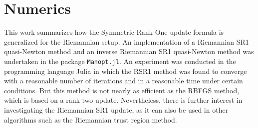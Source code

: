 \chapter{Numerics}

This work summarizes how the Symmetric Rank-One update formula is generalized for the Riemannian setup. An implementation of a Riemannian SR1 quasi-Newton method and an inverse Riemannian SR1 quasi-Newton method was undertaken in the package \lstinline!Manopt.jl!. An experiment was conducted in the programming language Julia in which the RSR1 method was found to converge with a reasonable number of iterations and in a reasonable time under certain conditions. But this method is not nearly as efficient as the RBFGS method, which is based on a rank-two update. Nevertheless, there is further interest in investigating the Riemannian SR1 update, as it can also be used in other algorithms such as the Riemannian trust region method. 